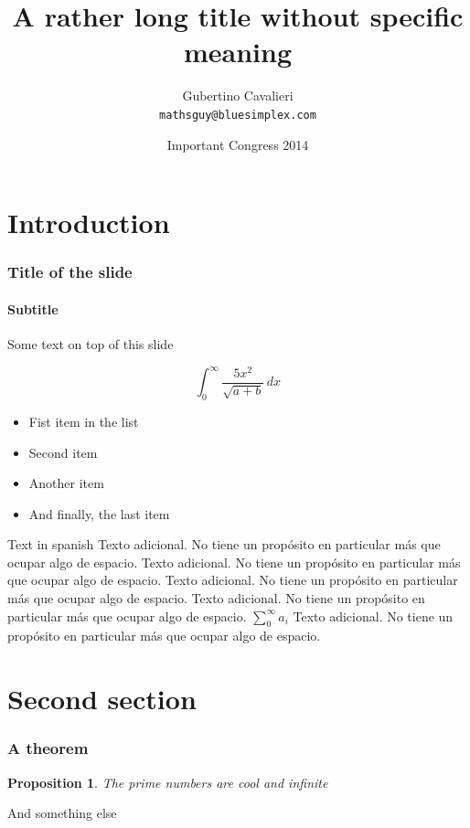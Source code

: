\documentclass{beamer}
\title{A rather long title without specific meaning}
\author{Gubertino Cavalieri\\ %
	      \texttt{mathsguy@bluesimplex.com}} %
\date{Important Congress 2014} %
\institute{Institute of Mathematics, Great University} %
\newtheorem{proposition}{Proposition}
\begin{document}
\begin{frame}

  \titlepage %
  
\end{frame}


\begin{frame}
\tableofcontents %
\end{frame}

\section{Introduction} %
\begin{frame}
  \frametitle{Title of the slide}
  \framesubtitle{Subtitle} %
  Some text on top of this slide
  
  \[
   \int_{0}^{\infty} \frac{5x^2}{\sqrt{a+b}}\, dx
   \]

  \begin{itemize}
    \item[\checkmark] Fist item in the list %
    \item Second item
    \item Another item
    \item And finally, the last item
  \end{itemize}
\end{frame}

\begin{frame}{Text in spanish} %
Texto adicional. No tiene un propósito en particular más que ocupar algo de espacio.
Texto adicional. No tiene un propósito en particular más que ocupar algo de espacio.
Texto adicional. No tiene un propósito en particular más que ocupar algo de espacio.
Texto adicional. No tiene un propósito en particular más que ocupar algo de espacio.
\( \sum_0^{\infty} a_i \) 
Texto adicional. No tiene un propósito en particular más que ocupar algo de espacio.
\end{frame}

\section{Second section} %
\begin{frame}
    \frametitle{A theorem}
    
    \begin{proposition} %
        The prime numbers are cool and infinite
    \end{proposition}

    And something else

\end{frame}
\end{document}

